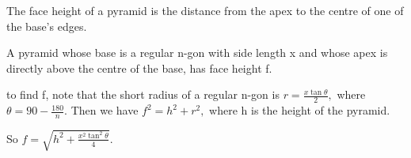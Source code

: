 The face height of a pyramid is the distance from the apex to 
the centre of one of the base's edges.
\par
A pyramid whose base is a regular n-gon with side length
x and whose apex is directly above
the centre of the base, has face height f. 
\par
to find f, note that the short radius of a regular n-gon is
$ r = \frac{x \tan \theta }{2} , $ where $ \theta = 90 - \frac{180}{n} . $
Then we have $f^{2}=h^{2}+r^{2},$  where h is the height of the pyramid.
\par
So $ f = \sqrt{h^2 + \frac{x^2 \tan ^2 \theta }{4} } . $